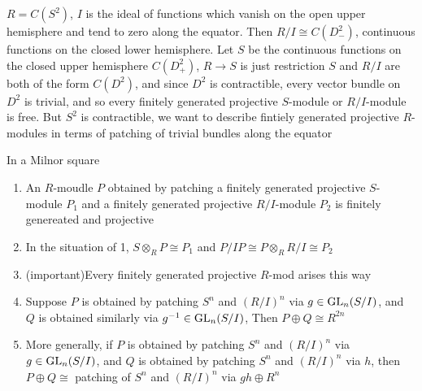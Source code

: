 \documentclass[main]{subfiles}
\begin{document}
\begin{example}
$R=C(S^2)$, $I$ is the ideal of functions which vanish on the open upper hemisphere and tend to zero along the equator. Then $R/I\cong C(D^2_-)$, continuous functions on the closed lower hemisphere. Let $S$ be the continuous functions on the closed upper hemisphere $C(D^2_+)$, $R\to S$ is just restriction
$S$ and $R/I$ are both of the form $C(D^2)$, and since $D^2$ is contractible, every vector bundle on $D^2$ is trivial, and so every finitely generated projective $S$-module or $R/I$-module is free. But $S^2$ is contractible, we want to describe fintiely generated projective $R$-modules in terms of patching of trivial bundles along the equator
\end{example}

\begin{theorem}
In a Milnor square
\begin{enumerate}
\item An $R$-moudle $P$ obtained by patching a finitely generated projective $S$-module $P_1$ and a finitely generated projective $R/I$-module $P_2$ is finitely genereated and projective
\item In the situation of 1, $S\otimes_R P\cong P_1$ and $P/IP\cong P\otimes_RR/I\cong P_2$
\item (important)Every finitely generated projective $R$-mod arises this way
\item Suppose $P$ is obtained by patching $S^n$ and $(R/I)^n$ via $g\in\operatorname{GL}_n(S/I)$, and $Q$ is obtained similarly via $g^{-1}\in \operatorname{GL}_n(S/I)$, Then $P\oplus Q\cong R^{2n}$
\item More generally, if $P$ is obtained by patching $S^n$ and $(R/I)^n$ via $g\in\operatorname{GL}_n(S/I)$, and $Q$ is obtained by patching $S^n$ and $(R/I)^n$ via $h$, then $P\oplus Q\cong$ patching of $S^n$ and $(R/I)^n$ via $gh\oplus R^{n}$
\end{enumerate}
\end{theorem}
\end{document}
